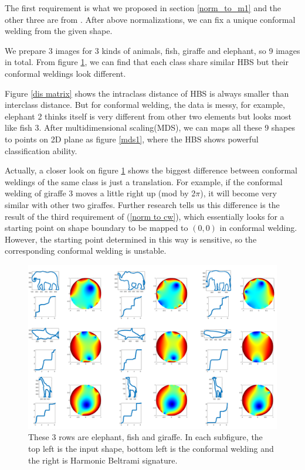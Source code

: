 \documentclass[review,onefignum,onetabnum]{siamonline190516}
\begin{document}
        The first requirement is what we proposed in section \ref{norm_to_m1} and the other three are from \cite{sharon20062d}. After above normalizations, we can fix a unique conformal welding from the given shape.

        We prepare 3 images for 3 kinds of animals, fish, giraffe and elephant, so 9 images in total. From figure \ref{classification images}, we can find that each class share similar HBS but their conformal weldings look different. 
        
        Figure \ref{dis matrix} shows the intraclass distance of HBS is always smaller than interclass distance. But for conformal welding, the data is messy, for example, elephant 2 thinks itself is very different from other two elements but looks most like fish 3. After multidimensional scaling(MDS), we can maps all these 9 shapes to points on 2D plane as figure \ref{mds1}, where the HBS shows powerful classification ability.
        
        Actually, a closer look on figure \ref{classification images} shows the biggest difference between conformal weldings of the same class is just a translation. For example, if the conformal welding of giraffe 3 moves a little right up (mod by 2$\pi$), it will become very similar with other two giraffes. Further research tells us this difference is the result of the third requirement of (\ref{norm to cw}), which essentially looks for a starting point on shape boundary to be mapped to $(0, 0)$ in conformal welding. However, the starting point determined in this way is sensitive, so the corresponding conformal welding is unstable.

        \begin{figure}
            \begin{center}
                \includegraphics[width=12cm]{figs.png}
            \end{center}
            \caption{These 3 rows are elephant, fish and giraffe. In each subfigure, the top left is the input shape, bottom left is the conformal welding and the right is Harmonic Beltrami signature.}
            \label{classification images}
        \end{figure}
\end{document}

